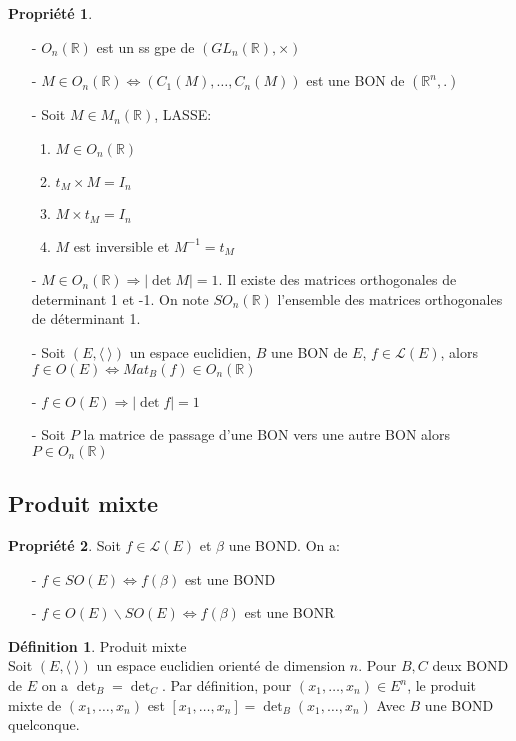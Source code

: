 \documentclass[fleqn]{article}
\theoremstyle{definition} \newtheorem*{defi}{D\'efinition}
\theoremstyle{definition} \newtheorem*{theo}{Th\'eor\`eme}
\theoremstyle{definition} \newtheorem*{coro}{Corollaire}
\theoremstyle{remark} \newtheorem*{rqs}{Remarques}
\theoremstyle{definition} \newtheorem*{prop}{Propri\'et\'e}
\begin{document}
\begin{prop} $ $
	\begin{enumerate}
		\item [-] $O_n(\mathbb{R})$ est un ss gpe de $(GL_n(\mathbb{R}), \times)$
		\item [-] $M \in O_n(\mathbb{R}) \Leftrightarrow (C_1(M), \hdots, C_n(M))$ est une BON de $(\mathbb{R}^n, .)$
		\item [-] Soit $M \in M_n(\mathbb{R})$, LASSE:
			\begin{enumerate}
				\item $M \in O_n(\mathbb{R})$
				\item $t_M \times M = I_n$
				\item $M \times t_M = I_n$
				\item $M$ est inversible et $M^{-1} = t_M$
			\end{enumerate}
		\item [-] $M \in O_n(\mathbb{R}) \Rightarrow |\det M| = 1$.  Il existe des matrices orthogonales de determinant 1 et -1. On note
			$SO_n(\mathbb{R})$ l'ensemble des matrices orthogonales de d\'eterminant 1.
		\item [-] Soit $(E, \langle\  \rangle)$ un espace euclidien, $B$ une BON de $E$, $f \in \mathscr{L}(E)$, alors $f \in O(E)
			\Leftrightarrow Mat_B(f) \in O_n(\mathbb{R})$
		\item [-] $f \in O(E) \Rightarrow |\det f| = 1$
		\item [-] Soit $P$ la matrice de passage d'une BON vers une autre BON alors $P \in O_n(\mathbb{R})$
	\end{enumerate}
\end{prop}

\subsection{Produit mixte}

\begin{prop}
	Soit $f \in \mathscr{L}(E)$ et $\beta$ une BOND. On a:
	\begin{itemize}
		\item [-] $f \in SO(E) \Leftrightarrow f(\beta)$ est une BOND
		\item [-] $f \in O(E) \backslash SO(E) \Leftrightarrow f(\beta)$ est une BONR
	\end{itemize}
\end{prop}

\begin{defi} Produit mixte \\
	Soit $(E, \langle\   \rangle)$ un espace euclidien orient\'e de dimension $n$. Pour $B,C$ deux BOND de $E$ on a $\det_B = \det_C$.
	Par d\'efinition, pour $(x_1, \hdots, x_n) \in E^n$, le produit mixte de $(x_1, \hdots, x_n)$ est $[x_1, \hdots, x_n] =
	\det_B (x_1, \hdots, x_n)$ Avec $B$ une BOND quelconque.
\end{defi}
\end{document}
